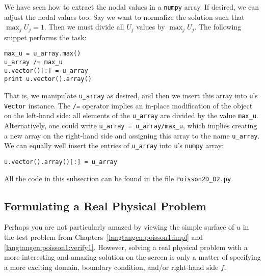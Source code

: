 We have seen how to extract the nodal values in a {\fontsize{12pt}{12pt}\texttt{numpy}} array.
If desired, we can adjust the nodal values too. Say we want to
normalize the solution such that $\max_j U_j = 1$. Then we
must divide all $U_j$ values
by $\max_j U_j$. The following snippet performs the task:
\begin{Verbatim}[fontsize=\fontsize{10pt}{10pt},tabsize=8,baselinestretch=1.05,
fontfamily=tt,xleftmargin=7mm]
max_u = u_array.max()
u_array /= max_u
u.vector()[:] = u_array
print u.vector().array()
\end{Verbatim}
\noindent
That is, we manipulate {\fontsize{12pt}{12pt}\verb!u_array!} as desired, and then
we insert this array into {\fontsize{12pt}{12pt}\texttt{u}}'s {\fontsize{12pt}{12pt}\texttt{Vector}} instance.
The {\fontsize{12pt}{12pt}\verb!/=!} operator implies an
in-place modification of the object on the left-hand side: all
elements of the {\fontsize{12pt}{12pt}\verb!u_array!} are divided by the value {\fontsize{12pt}{12pt}\verb!max_u!}.
Alternatively, one could write
{\fontsize{12pt}{12pt}\verb!u_array = u_array/max_u!}, which implies creating a new
array on the right-hand side and assigning this array to the
name {\fontsize{12pt}{12pt}\verb!u_array!}.
We can equally well insert the entries of {\fontsize{12pt}{12pt}\verb!u_array!} into
{\fontsize{12pt}{12pt}\texttt{u}}'s {\fontsize{12pt}{12pt}\texttt{numpy}} array:
\begin{Verbatim}[fontsize=\fontsize{10pt}{10pt},tabsize=8,baselinestretch=1.05,
fontfamily=tt,xleftmargin=7mm]
u.vector().array()[:] = u_array
\end{Verbatim}
\noindent
All the code in this subsection can be found in the file {\fontsize{12pt}{12pt}\verb!Poisson2D_D2.py!}.


\subsection{Formulating a Real Physical Problem}
\label{langtangen:poisson:membrane}

Perhaps you are not particularly 
amazed by viewing the simple surface of $u$ in the 
test problem from Chapters~\ref{langtangen:poisson1:impl}
and \ref{langtangen:poisson1:verify1}.
However, solving a real physical problem with a more interesting and amazing 
solution on the screen
is only a matter
of specifying a more exciting domain, boundary condition, and/or
right-hand side $f$.

